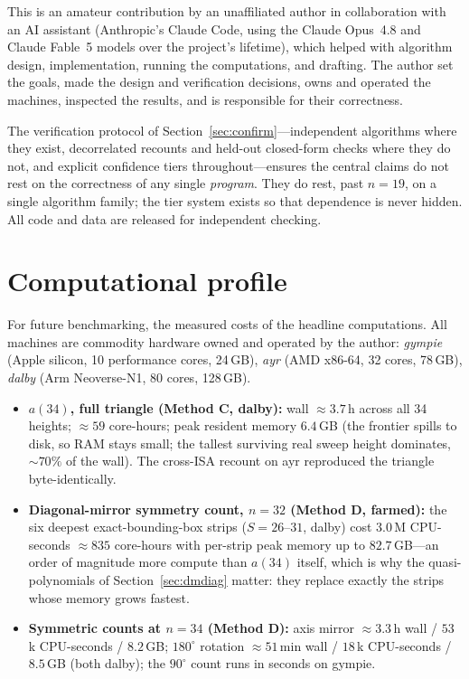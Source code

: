 \documentclass[11pt]{article}
\begin{document}
This is an amateur contribution by an unaffiliated author in collaboration
with an AI assistant (Anthropic's Claude Code, using the Claude Opus~4.8 and
Claude Fable~5 models over the project's lifetime), which helped with
algorithm design, implementation, running the computations, and drafting.
The author set the goals, made the design and verification decisions, owns
and operated the machines, inspected the results, and is responsible for
their correctness.

The verification protocol of Section~\ref{sec:confirm}---independent
algorithms where they exist, decorrelated recounts and held-out closed-form
checks where they do not, and explicit confidence tiers throughout---ensures
the central claims do not rest on the correctness of any single
\emph{program}. They do rest, past $n=19$, on a single algorithm family;
the tier system exists so that dependence is never hidden. All code and data
are released for independent checking.

\appendix
\section{Computational profile}
\label{sec:profile}

For future benchmarking, the measured costs of the headline computations.
All machines are commodity hardware owned and operated by the author:
\emph{gympie} (Apple silicon, 10 performance cores, 24\,GB), \emph{ayr}
(AMD x86-64, 32 cores, 78\,GB), \emph{dalby} (Arm Neoverse-N1, 80 cores,
128\,GB).

\begin{itemize}
  \item \textbf{$a(34)$, full triangle (Method C, dalby):} wall
        $\approx3.7$\,h across all 34 heights; $\approx59$ core-hours; peak
        resident memory $6.4$\,GB (the frontier spills to disk, so RAM
        stays small; the tallest surviving real sweep height dominates,
        $\sim70\%$ of the wall). The cross-ISA recount on ayr reproduced
        the triangle byte-identically.
  \item \textbf{Diagonal-mirror symmetry count, $n=32$ (Method D, farmed):}
        the six deepest exact-bounding-box strips ($S=26$--$31$, dalby)
        cost $3.0$\,M CPU-seconds $\approx835$ core-hours with per-strip
        peak memory up to $82.7$\,GB---an order of magnitude more compute
        than $a(34)$ itself, which is why the quasi-polynomials of
        Section~\ref{sec:dmdiag} matter: they replace exactly the strips
        whose memory grows fastest.
  \item \textbf{Symmetric counts at $n=34$ (Method D):} axis mirror
        $\approx3.3$\,h wall / $53$\,k CPU-seconds / $8.2$\,GB;
        $180^\circ$ rotation $\approx51$\,min wall / $18$\,k CPU-seconds /
        $8.5$\,GB (both dalby); the $90^\circ$ count runs in seconds on
        gympie.
\end{itemize}
\end{document}
